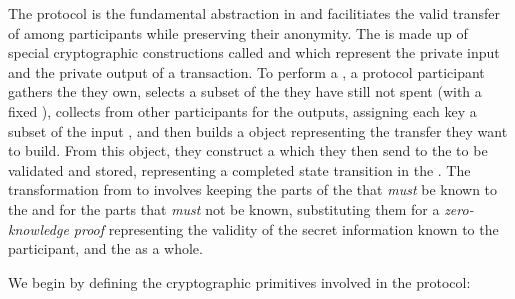 The \Transfer{} protocol is the fundamental abstraction in \MantaPay{} and facilitiates the valid transfer of  among participants while preserving their anonymity. The \Transfer{} is made up of special cryptographic constructions called  and  which represent the private input and the private output of a transaction. To perform a \Transfer{}, a protocol participant gathers the  they own, selects a subset of the  they have still not spent (with a fixed \AssetId{}), collects  from other participants for the outputs, assigning each key a subset of the input , and then builds a \Transfer{} object representing the transfer they want to build. From this \Transfer{} object, they construct a \TransferPost{} which they then send to the \Ledger{} to be validated and stored, representing a completed state transition in the \Ledger{}. The transformation from \Transfer{} to \TransferPost{} involves keeping the parts of the \Transfer{} that \emph{must} be known to the \Ledger{} and for the parts that \emph{must} not be known, substituting them for a \emph{zero-knowledge proof} representing the validity of the secret information known to the participant, and the \Transfer{} as a whole.

We begin by defining the cryptographic primitives involved in the \Transfer{} protocol:

